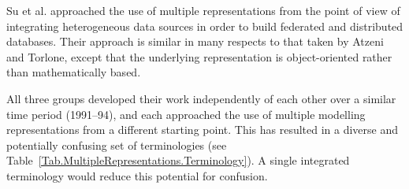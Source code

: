\documentclass[11pt,oribibl]{llncs}
\begin{document}
Su et al. \cite{Su:SYW:1993,Su:SYW:1992} approached the use of multiple representations from the point of view of integrating heterogeneous data sources in order to build federated and distributed databases. Their approach is similar in many respects to that taken by Atzeni and Torlone, except that the underlying representation is object-oriented rather than mathematically based.

All three groups developed their work independently of each other over a similar time period (1991--94), and each approached the use of multiple modelling representations from a different starting point. This has resulted in a diverse and potentially confusing set of terminologies (see Table~\ref{Tab.MultipleRepresentations.Terminology}). A single integrated terminology would reduce this potential for confusion.


\newcommand{\tabnote}[1]{\textrm{\textsuperscript{#1}}}
\renewcommand{\thetnote}{\alph{tnote}}
\newenvironment{tabnotes}[1]%
	{	\vspace{\baselineskip}
		\begin{minipage}{0.95\columnwidth}
			\textbf{#1}
			\begin{list}{\thetnote}%
			{	\setlength{\topsep}{0pt}
				\setlength{\itemsep}{0pt}
				\setlength{\parsep}{0pt}
				\usecounter{tnote}
				\renewcommand{\makelabel}[1]{\hfil{\textsuperscript{##1}}}
			}
	}%
	{		\end{list}
		\end{minipage}
	}

\newlength{\mra}
\newlength{\mrb}
\newlength{\mrc}
\newlength{\mrd}
\newlength{\mre}

\newlength{\BIGlen}
\newcommand{\BIGL}[2][0cm]{
	\setlength{\BIGlen}{#1} \divide\BIGlen by 2
	$\left\}\text{ \rule[-\BIGlen]{0cm}{#1}#2}\right.$}
\end{document}
